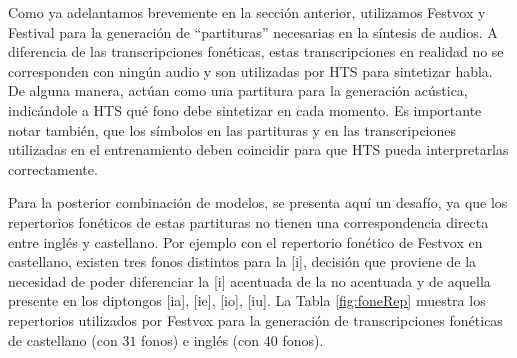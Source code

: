 
Como ya adelantamos brevemente en la sección anterior, utilizamos Festvox y Festival para la generación de ``partituras'' necesarias en la síntesis de audios. A diferencia de las transcripciones fonéticas, estas transcripciones en realidad no se corresponden con ningún audio y son utilizadas por HTS para sintetizar habla. De alguna manera, actúan como una partitura para la generación acústica, indicándole a HTS qué fono debe sintetizar en cada momento. Es importante notar también, que los símbolos en las partituras y en las transcripciones utilizadas en el entrenamiento deben coincidir para que HTS pueda interpretarlas correctamente.  

Para la posterior combinación de modelos, se presenta aquí un desafío, ya que los repertorios fonéticos de estas partituras no tienen una correspondencia directa entre inglés y castellano. Por ejemplo con el repertorio fonético de Festvox en castellano, existen tres fonos distintos para la [i], decisión que proviene de la necesidad de poder diferenciar la [i] acentuada de la no acentuada  y de aquella presente en los diptongos [ia], [ie], [io], [iu]. La Tabla \ref{fig:foneRep} muestra los repertorios utilizados por Festvox para la generación de transcripciones fonéticas de castellano (con $31$ fonos) e inglés (con $40$ fonos).

